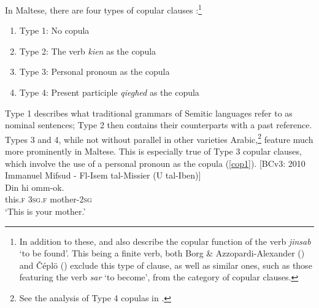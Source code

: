 \documentclass[output=paper]{langsci/langscibook}
\begin{document}
 \label{Copular} %
In Maltese, there are four types of copular clauses \citep[53]{BorgAzzopardi-Alexander1997}:\footnote{In addition to these, \cite{Borg1987} and \cite{borgspagnol2015} also describe the copular function of the verb \textit{jinsab} `to be found'. This being a finite verb, both Borg \& Azzopardi-Alexander (\citeyear[53]{BorgAzzopardi-Alexander1997}) and Čéplö (\citeyear[99--104]{bulbul2018}) exclude this type of clause, as well as similar ones, such as those featuring the verb \textit{sar} `to become', from the category of copular clauses.}
\begin{enumerate}[noitemsep]
	\item[] Type 1: No copula
    \item[] Type 2: The verb \textit{kien} as the copula
	\item[] Type 3: Personal pronoun as the copula
	\item[] Type 4: Present participle \textit{qiegħed} as the copula	
\end{enumerate}
Type 1 describes what traditional grammars of Semitic languages refer to as nominal sentences; Type 2 then contains their counterparts with a past reference. Types 3 and 4, while not without parallel in other varieties Arabic,\footnote{See the analysis of Type 4 copulas in \cite{camillerisadler2018}.} feature much more prominently in Maltese. This is especially true of Type 3 copular clauses, which involve the use of a personal pronoun as the copula (\ref{cop1}). 
\ea\label{cop1} 
{[BCv3: 2010 Immanuel Mifsud - Fl-Isem tal-Missier (U tal-Iben)]}\\
\gll Din hi omm-ok.\\
	this.\textsc{f} \textsc{3sg.f} mother-\textsc{2sg}\\
	\glt `This is your mother.'\\
\z
\end{document}
